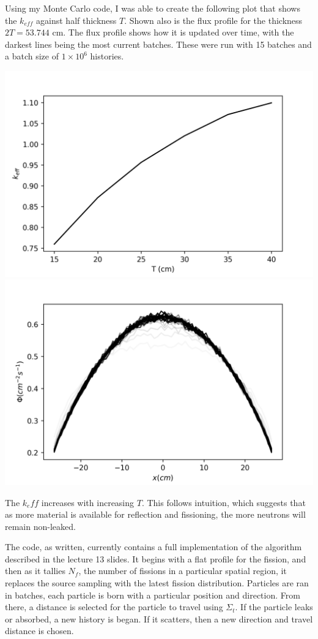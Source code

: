 \documentclass{amsart}
\theoremstyle{definition}
\begin{document}
Using my Monte Carlo code, I was able to create the following plot that shows the $k_{eff}$ against half thickness $T$.
Shown also is the flux profile for the thickness $2T = 53.744$ cm.
The flux profile shows how it is updated over time, with the darkest lines being the most current batches.
These were run with 15 batches and a batch size of $1 \times 10^6$ histories.

\begin{center}
\includegraphics[totalheight=.40\textheight]{k_vs_T.png}
\includegraphics[totalheight=.40\textheight]{t_crit.png}
\end{center}

The $k_eff$ increases with increasing $T$.
This follows intuition, which suggests that as more material is available for reflection and fissioning, the more neutrons will remain non-leaked.

The code, as written, currently contains a full implementation of the algorithm described in the lecture 13 slides.
It begins with a flat profile for the fission, and then as it tallies $N_f$, the number of fissions in a particular spatial region, it replaces the source sampling with the latest fission distribution.
Particles are ran in batches, each particle is born with a particular position and direction.
From there, a distance is selected for the particle to travel using $\Sigma_t$.
If the particle leaks or absorbed, a new history is began.
If it scatters, then a new direction and travel distance is chosen.
\end{document}
